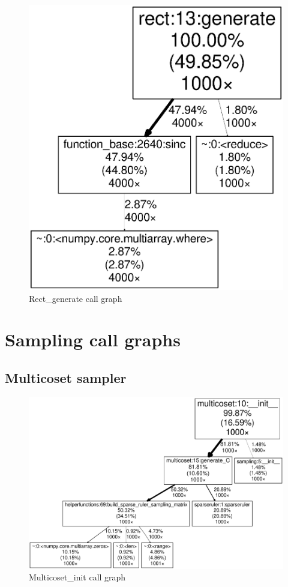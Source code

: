 \documentclass[a4paper, openany, oneside]{memoir}
\begin{document}
\begin{figure}[H]
    \centering
    \includegraphics[width=0.8\linewidth]{Rect_generate}
    \caption{Rect\_generate call graph}
    \label{fig:Rect_generate}
\end{figure}

\section{Sampling call graphs}
\label{sec:sampling_call_graphs}
\subsection{Multicoset sampler}
\label{sub:multicoset_sampler}

\begin{figure}[H]
    \centering
    \includegraphics[width=0.8\linewidth]{Multicoset_init}
    \caption{Multicoset\_init call graph}
    \label{fig:Multicoset_init}
\end{figure}
\end{document}
